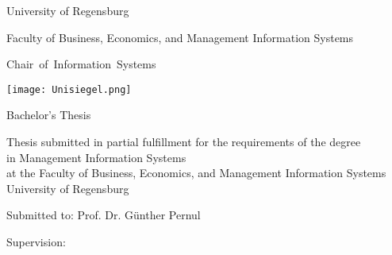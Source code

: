 %
%
%

\thispagestyle{empty}
\begin{titlepage}

\begin{adjustwidth}{-2cm}{}


\renewcommand{\thepage}{}

\begin{center}

\large{University of Regensburg\\}

\large{Faculty of Business, Economics, and Management Information Systems\\}

\large{\mbox{{Chair of Information Systems}}}

\vspace*{5mm}

\Large{\textbf{\titlethema}}

\vspace*{5mm}
\texttt{[image: Unisiegel.png]}
\vspace*{4mm}

\Large{Bachelor's Thesis}

\vspace*{5mm}


\end{center}
\begin{center}
Thesis submitted in partial fulfillment for the requirements of the degree \\
 in Management Information Systems \\
at the Faculty of Business, Economics, and Management Information Systems\\
University of Regensburg

\vspace*{5mm}

\Large{Submitted to: Prof. Dr. Günther Pernul\\}

\Large{Supervision: \supervisor\\} 

\end{center}

\vfill

\begin{center}
\large{\submissiondate\\}
\end{center}


\end{adjustwidth}
\end{titlepage}
